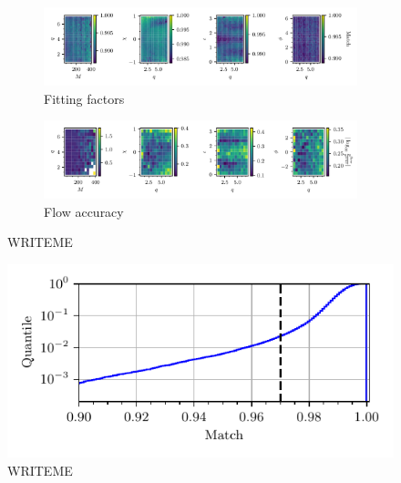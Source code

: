\documentclass[twocolumn,showpacs,preprintnumbers,nofootinbib,prd,
superscriptaddress,10pt]{revtex4-2}
\begin{document}
\begin{figure}[t]
	\centering
	\begin{subfigure}[t]{\textwidth}
		\includegraphics[scale = 1.]{HM_injections}
		\caption{Fitting factors}
		\label{fig:HM_fitting_factor}
	\end{subfigure}
	\begin{subfigure}[t]{\textwidth}
		\includegraphics[scale = 1.]{HM_flow_accuracy}
		\caption{Flow accuracy}
		\label{fig:HM_flow}
	\end{subfigure}
	\caption{WRITEME}
	\label{fig:HM_injections}
\end{figure}


\begin{figure}[t]
	\centering
	\includegraphics[scale = 1.]{HM_hist}
	\caption{WRITEME}
	\label{fig:HM_hist}
\end{figure}
\end{document}
